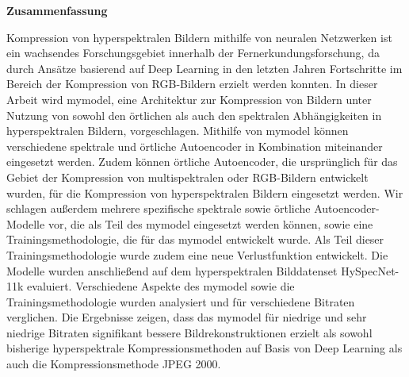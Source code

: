 \thispagestyle{empty}
\vspace*{1.4cm}

\begin{center}
    {\Large \textbf{Zusammenfassung}}
\end{center}

\vspace*{0.5cm}

\noindent 
Kompression von hyperspektralen Bildern mithilfe von neuralen Netzwerken ist ein wachsendes Forschungsgebiet innerhalb der Fernerkundungsforschung, da durch Ansätze basierend auf Deep Learning in den letzten Jahren Fortschritte im Bereich der Kompression von RGB-Bildern erzielt werden konnten. In dieser Arbeit wird \ac{mymodel}, eine Architektur zur Kompression von Bildern unter Nutzung von sowohl den örtlichen als auch den spektralen Abhängigkeiten in hyperspektralen Bildern, vorgeschlagen. Mithilfe von \ac{mymodel} können verschiedene spektrale und örtliche Autoencoder in Kombination miteinander eingesetzt werden. Zudem können örtliche Autoencoder, die ursprünglich für das Gebiet der Kompression von multispektralen oder RGB-Bildern entwickelt wurden, für die Kompression von hyperspektralen Bildern eingesetzt werden. Wir schlagen außerdem mehrere spezifische spektrale sowie örtliche Autoencoder-Modelle vor, die als Teil des \ac{mymodel} eingesetzt werden können, sowie eine Trainingsmethodologie, die für das \ac{mymodel} entwickelt wurde. Als Teil dieser Trainingsmethodologie wurde zudem eine neue Verlustfunktion entwickelt. Die Modelle wurden anschließend auf dem hyperspektralen Bilddatenset HySpecNet-11k evaluiert. Verschiedene Aspekte des \ac{mymodel} sowie die Trainingsmethodologie wurden analysiert und für verschiedene Bitraten verglichen. Die Ergebnisse zeigen, dass das \ac{mymodel} für niedrige und sehr niedrige Bitraten signifikant bessere Bildrekonstruktionen erzielt als sowohl bisherige hyperspektrale Kompressionsmethoden auf Basis von Deep Learning als auch die Kompressionsmethode JPEG 2000.